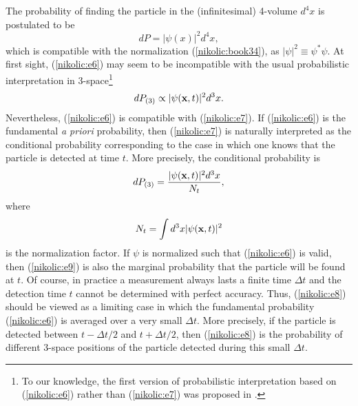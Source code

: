 \documentclass[12pt,twoside]{report} %
\begin{document}
The probability of finding the particle in the (infinitesimal) 4-volume $d^4x$
is postulated to be
\begin{equation}\label{nikolic:e6}
dP=|\psi(x)|^2d^4x ,
\end{equation}
which is compatible with the normalization (\ref{nikolic:book34}), as $|\psi|^2 \equiv \psi^*\psi$.
At first sight, (\ref{nikolic:e6}) may seem to be incompatible with the usual
probabilistic interpretation in 3-space\footnote{To our knowledge, the first version of probabilistic interpretation
based on (\ref{nikolic:e6}) rather than (\ref{nikolic:e7}) was proposed in \cite{stuc}.} 
\begin{equation}\label{nikolic:e7}
dP_{(3)}\propto |\psi({\bf x},t)|^2d^3x .
\end{equation}
Nevertheless, (\ref{nikolic:e6}) is compatible with (\ref{nikolic:e7}). If (\ref{nikolic:e6})
is the fundamental {\it a priori} probability, then (\ref{nikolic:e7})
is naturally interpreted as the conditional probability corresponding to the case
in which one knows that the particle is detected at time $t$.
More precisely, the conditional probability is
\begin{equation}\label{nikolic:e8}
dP_{(3)}=\frac{|\psi({\bf x},t)|^2 d^3x}{N_t},
\end{equation}
where 
\begin{equation}\label{nikolic:e9}
 N_t=\int d^3x |\psi({\bf x},t)|^2 
\end{equation}
is the normalization factor. If $\psi$ is normalized such that (\ref{nikolic:e6}) is valid,
then (\ref{nikolic:e9}) is also the marginal probability that the particle will be found
at $t$. Of course, in practice a measurement always lasts a finite time $\Delta t$
and the detection time $t$ cannot be determined with perfect accuracy. 
Thus, (\ref{nikolic:e8}) should be viewed as a limiting case in which
the fundamental probability (\ref{nikolic:e6}) is averaged over a very small $\Delta t$.
More precisely, if the particle is detected 
between $t-\Delta t/2$ and $t+\Delta t/2$, then  
(\ref{nikolic:e8}) is the probability of different 3-space positions of the particle detected 
during this small $\Delta t$.
\end{document}
